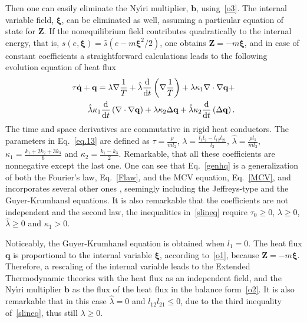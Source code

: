 \documentclass[sn-mathphys]{sn-jnl}%
\theoremstyle{thmstyleone}%
\theoremstyle{thmstyletwo}%
\theoremstyle{thmstylethree}%
\begin{document}
{Then one can easily eliminate the Ny\'\i{}ri multiplier, $\mathbf b$, using~\eqref{o3}. The internal variable field, $\boldsymbol{\xi}$, can be eliminated as well, assuming a particular equation of state for $\mathbf Z$. If the nonequilibrium field contributes quadratically to the internal energy, that is, $s(e,\boldsymbol{\xi})=\hat s(e-m\boldsymbol{\xi}^2/2)$, one obtains $\mathbf Z= -m\boldsymbol{\xi}$, and in case of constant coefficients a straightforward calculations leads to the following  evolution equation of heat flux
\begin{eqnarray}
	\label{eq.13}
	\tau \dot {\mathbf q}+ {\mathbf q}=\lambda \nabla\frac{1}{T}+
	\hat\lambda \frac{\rm d}{\textrm{d} t}\left(\nabla\frac{1}{T}\right) +
	\lambda\kappa_1 \nabla\cdot\nabla{\mathbf q} +\nonumber\\
	\hat\lambda \kappa_1\frac{\rm d}{\textrm{d} t}\left(\nabla\cdot\nabla {\mathbf q}\right) +
	\lambda\kappa_2 \Delta{\mathbf q} +
	\hat\lambda \kappa_2\frac{\rm d}{\textrm{d} t}\left(\Delta {\mathbf q}\right).
	\label{genhq}\end{eqnarray}
The time and space derivatives are commutative in rigid heat conductors. The parameters in Eq.~\eqref{eq.13} are defined as $\tau = \frac{\rho}{m l_2}$, $
\lambda=\frac{l_1l_2-l_{12}l_{21}}{l_2}$, $\hat\lambda=\frac{\rho l_1}{m l_2}$,
$\kappa_1=\frac{k_1+2k_2+3k_3}{6}$ and $\kappa_2=\frac{k_1\! -\! k_3}{2}$. Remarkable, that all these coefficients are nonnegative except the last one. One can see that Eq.~\eqref{genhq} is a generalization of both the Fourier's law, Eq.~\eqref{Flaw}, and the MCV equation, Eq.~\eqref{MCV}, and incorporates several other ones \cite{VanFul12a}, seemingly including the Jeffreys-type and the  Guyer-Krumhansl equations. It is also remarkable that the coefficients are not independent and the second law, the inequalities in~\eqref{slineq} require $\tau_0\geq 0$, $\lambda\geq 0$, $\hat \lambda\geq 0$ and $\kappa_1>0$.

Noticeably, the Guyer-Krumhansl equation is obtained when $l_1=0$. The heat flux $\mathbf q$ is proportional to the internal variable $\boldsymbol{\xi}$, according to~\eqref{o1}, because $\mathbf Z= -m\boldsymbol{\xi}$. Therefore, a rescaling of the internal variable leads to the Extended Thermodynamic theories with the heat flux as an independent field, and the Ny\'\i{}ri multiplier $\mathbf b$ as the flux of the heat flux in the balance form~\eqref{o2}. It is also remarkable that in this case $\hat \lambda=0$ and $l_{12}l_{21} \leq 0$, due to the third inequality of~\eqref{slineq},  thus still $\lambda \geq 0$.

}
\end{document}
